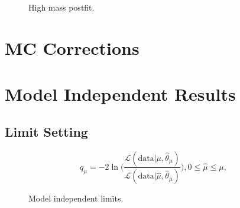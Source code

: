 \begin{figure}[!hbtp]
\caption{High mass postfit.}
\label{fig:high_mass_postfit}
\end{figure}

\section{MC Corrections}

\section{Model Independent Results}

\subsection{Limit Setting}

\begin{equation}
  q_{\mu} = -2 \ln \Biggl(\frac{\mathcal{L}(\text{data} | \mu, \hat{\theta}_{\mu})}{\mathcal{L}(\text{data} | \hat{\mu}, \hat{\theta}_{\hat{\mu}})}\Biggl), 0 \leq \hat{\mu} \leq \mu,
\end{equation}

\begin{figure}[!hbtp]
\centering
\caption{Model independent limits.}
\label{fig:model_independent_limits}
\end{figure}

